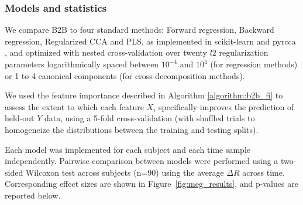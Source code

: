 \subsubsection{Models and statistics}

We compare B2B to four standard methods: Forward regression, Backward
regression, Regularized CCA and PLS, as implemented in scikit-learn
\citep{sklearn} and pyrcca \citep{bilenko2016pyrcca}, and optimized with nested cross-validation over twenty $l2$
regularization parameters logarithmically spaced between $10^{-4}$ and $10^4$
(for regression methods) or 1 to 4 canonical components (for cross-decomposition
methods).

We used the feature importance described in Algorithm \ref{algorithm:b2b_fi} to assess the extent to which each feature $X_i$ specifically improves the prediction of held-out $Y$ data, using a 5-fold cross-validation (with shuffled trials to homogeneize the distributions between the training and testing splits).

Each model was implemented for each subject and each time sample independently. Pairwise comparison between models were performed using a two-sided Wilcoxon test across subjects (n=90) using the average $\Delta R$ across time. Corresponding effect sizes are shown in Figure~\ref{fig:meg_results}, and p-values are reported below.


